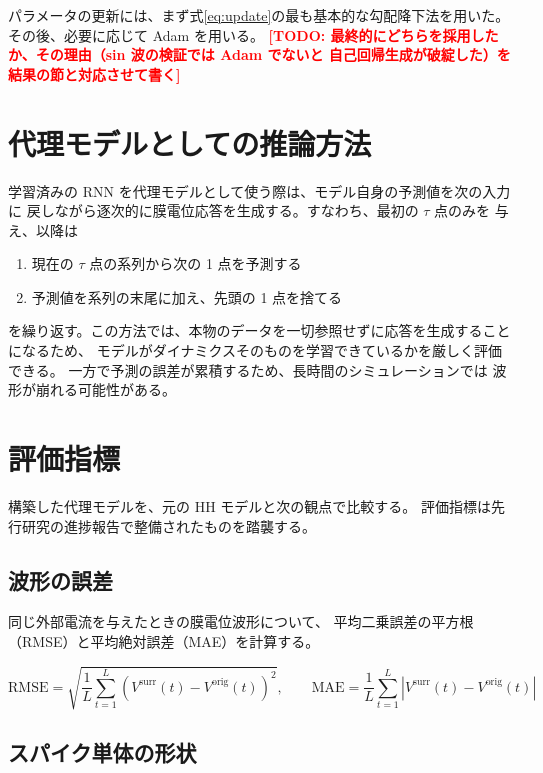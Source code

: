 \documentclass[a4paper,11pt,openany]{ltjsreport}
\newcommand{\TODO}[1]{\textcolor{red}{\textbf{[TODO: #1]}}}
\begin{document}
パラメータの更新には、まず式\eqref{eq:update}の最も基本的な勾配降下法を用いた。
その後、必要に応じて Adam\cite{kingma2015} を用いる。
\TODO{最終的にどちらを採用したか、その理由（sin 波の検証では Adam でないと
      自己回帰生成が破綻した）を結果の節と対応させて書く}

\section{代理モデルとしての推論方法}
\label{sec:inference}

学習済みの RNN を代理モデルとして使う際は、モデル自身の予測値を次の入力に
戻しながら逐次的に膜電位応答を生成する。すなわち、最初の $\tau$ 点のみを
与え、以降は

\begin{enumerate}
  \item 現在の $\tau$ 点の系列から次の 1 点を予測する
  \item 予測値を系列の末尾に加え、先頭の 1 点を捨てる
\end{enumerate}

を繰り返す。この方法では、本物のデータを一切参照せずに応答を生成することになるため、
モデルがダイナミクスそのものを学習できているかを厳しく評価できる。
一方で予測の誤差が累積するため、長時間のシミュレーションでは
波形が崩れる可能性がある。

\section{評価指標}
\label{sec:metrics}

構築した代理モデルを、元の HH モデルと次の観点で比較する。
評価指標は先行研究の進捗報告\cite{munechika2025}で整備されたものを踏襲する。

\subsection{波形の誤差}

同じ外部電流を与えたときの膜電位波形について、
平均二乗誤差の平方根（RMSE）と平均絶対誤差（MAE）を計算する。

\begin{equation}
  \mathrm{RMSE} = \sqrt{\frac{1}{L}\sum_{t=1}^{L}\left(V^{\mathrm{surr}}(t) - V^{\mathrm{orig}}(t)\right)^2},
  \qquad
  \mathrm{MAE} = \frac{1}{L}\sum_{t=1}^{L}\left|V^{\mathrm{surr}}(t) - V^{\mathrm{orig}}(t)\right|
  \label{eq:rmse}
\end{equation}

\subsection{スパイク単体の形状}
\end{document}
